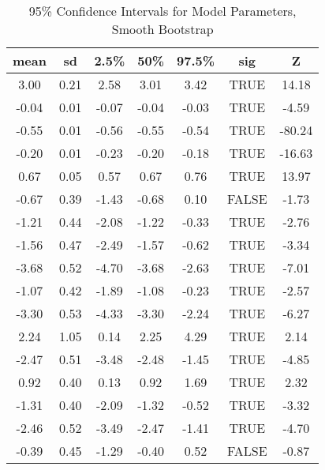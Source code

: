 \begin{table}[H]
\centering
\begin{tabular}{|c|c|c|c|c|c|c|}
  \hline
  \textbf{mean} & \textbf{sd} & \textbf{2.5\%} & \textbf{50\%} & \textbf{97.5\%} & \textbf{sig} & \textbf{Z} \\ 
  \hline
3.00 & 0.21 & 2.58 & 3.01 & 3.42 & TRUE & 14.18 \\ 
  -0.04 & 0.01 & -0.07 & -0.04 & -0.03 & TRUE & -4.59 \\ 
  -0.55 & 0.01 & -0.56 & -0.55 & -0.54 & TRUE & -80.24 \\ 
  -0.20 & 0.01 & -0.23 & -0.20 & -0.18 & TRUE & -16.63 \\ 
  0.67 & 0.05 & 0.57 & 0.67 & 0.76 & TRUE & 13.97 \\ 
  -0.67 & 0.39 & -1.43 & -0.68 & 0.10 & FALSE & -1.73 \\ 
  -1.21 & 0.44 & -2.08 & -1.22 & -0.33 & TRUE & -2.76 \\ 
  -1.56 & 0.47 & -2.49 & -1.57 & -0.62 & TRUE & -3.34 \\ 
  -3.68 & 0.52 & -4.70 & -3.68 & -2.63 & TRUE & -7.01 \\ 
  -1.07 & 0.42 & -1.89 & -1.08 & -0.23 & TRUE & -2.57 \\ 
  -3.30 & 0.53 & -4.33 & -3.30 & -2.24 & TRUE & -6.27 \\ 
  2.24 & 1.05 & 0.14 & 2.25 & 4.29 & TRUE & 2.14 \\ 
  -2.47 & 0.51 & -3.48 & -2.48 & -1.45 & TRUE & -4.85 \\ 
  0.92 & 0.40 & 0.13 & 0.92 & 1.69 & TRUE & 2.32 \\ 
  -1.31 & 0.40 & -2.09 & -1.32 & -0.52 & TRUE & -3.32 \\ 
  -2.46 & 0.52 & -3.49 & -2.47 & -1.41 & TRUE & -4.70 \\ 
  -0.39 & 0.45 & -1.29 & -0.40 & 0.52 & FALSE & -0.87 \\ 
   \hline
\end{tabular}
\caption{95\% Confidence Intervals for Model Parameters, Smooth Bootstrap}
\end{table}
